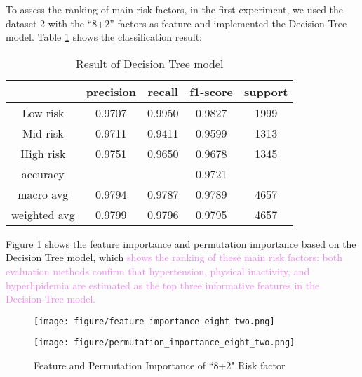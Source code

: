 \documentclass{article}
\begin{document}
To assess the ranking of main risk factors, in the first experiment, we used the dataset 2 with the ``8+2'' factors as feature and implemented the Decision-Tree model.  Table \ref{table:DT-main-factor} shows the classification result:
\begin{table}[H]
\small
\centering
\begin{tabular}{ccccc}
\hline
\textbf{}    & \textbf{precision} & \textbf{recall} & \textbf{f1-score} & \textbf{support} \\ \hline
Low risk     & 0.9707             & 0.9950             & 0.9827            & 1999           \\
Mid risk     & 0.9711             & 0.9411          & 0.9599            & 1313           \\
High risk    & 0.9751                & 0.9650          & 0.9678            & 1345           \\
accuracy     &                    &                 & 0.9721            &                  \\
macro avg    & 0.9794             & 0.9787          & 0.9789            & 4657           \\
weighted avg & 0.9799             & 0.9796          & 0.9795            & 4657           \\ \hline
\end{tabular}
\caption{Result of Decision Tree model} \label{table:DT-main-factor}
\end{table}

Figure \ref{fig:feature_permutation_10_factor} shows the feature importance and permutation importance based on the Decision Tree model, which \textcolor{violet}{shows the ranking of these main risk factors: both evaluation methods confirm that hypertension, physical inactivity, and hyperlipidemia are estimated as the top three informative features in the Decision-Tree model.} 

\begin{figure}[H]
\centering
\begin{minipage}[t]{0.48\textwidth}
\centering
\texttt{[image: figure/feature\_importance\_eight\_two.png]}
\end{minipage}
\begin{minipage}[t]{0.48\textwidth}
\centering
\texttt{[image: figure/permutation\_importance\_eight\_two.png]}
\end{minipage}
\caption{Feature and Permutation Importance of ``8+2" Risk factor}\label{fig:feature_permutation_10_factor}
\end{figure}
\end{document}
